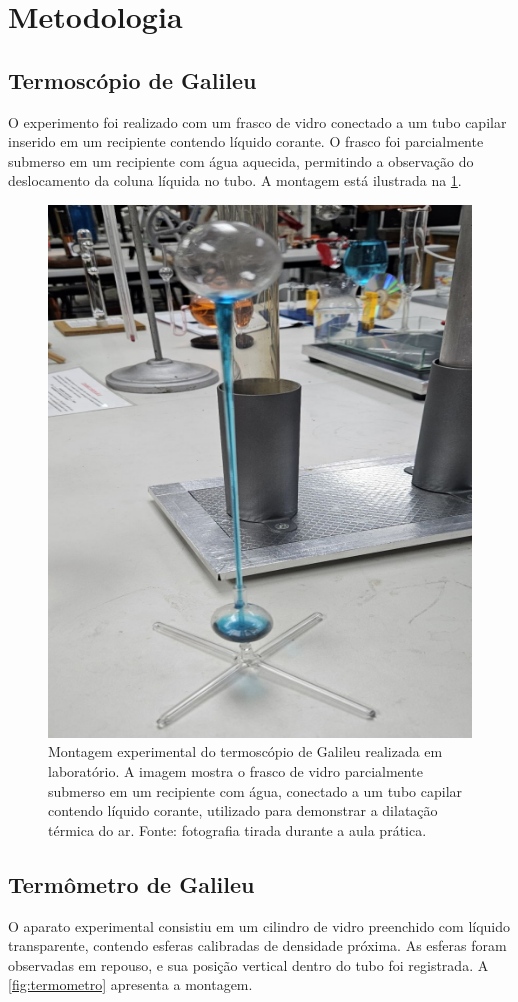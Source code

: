 \section{Metodologia}

\subsection{Termoscópio de Galileu}
O experimento foi realizado com um frasco de vidro conectado a um tubo capilar inserido em um recipiente contendo líquido corante. O frasco foi parcialmente submerso em um recipiente com água aquecida, permitindo a observação do deslocamento da coluna líquida no tubo. A montagem está ilustrada na \cref{fig:termoscopio}.

\begin{figure}[H]
    \centering
    \includegraphics[width=0.35\linewidth]{fig/termoscopio.png}
    \caption{Montagem experimental do termoscópio de Galileu realizada em laboratório. A imagem mostra o frasco de vidro parcialmente submerso em um recipiente com água, conectado a um tubo capilar contendo líquido corante, utilizado para demonstrar a dilatação térmica do ar. Fonte: fotografia tirada durante a aula prática.}
    \label{fig:termoscopio}
\end{figure}

\subsection{Termômetro de Galileu}
O aparato experimental consistiu em um cilindro de vidro preenchido com líquido transparente, contendo esferas calibradas de densidade próxima. As esferas foram observadas em repouso, e sua posição vertical dentro do tubo foi registrada. A \cref{fig:termometro} apresenta a montagem.

